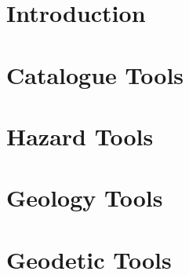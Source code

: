 \documentclass[11pt,fleqn]{book} %
\begin{document}
\pagestyle{fancy} %

\chapter{Introduction}
\label{chap:intro}


\chapter{Catalogue Tools}
\label{chap:catalogue}


\chapter{Hazard Tools}
\label{chap:hazard}


\chapter{Geology Tools}
\label{chap:geology}


\chapter{Geodetic Tools}
\label{chap:geodesy}

\end{document}

